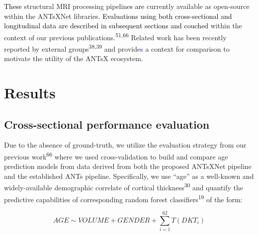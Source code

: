 \documentclass[
  12pt,
]{article}
\begin{document}
\textcolor{black}{These} structural MRI processing
pipeline\textcolor{black}{s
are} currently available as open-source within the ANTsXNet libraries.
\textcolor{black}{Evaluations using both cross-sectional and longitudinal data
are described in subsequent sections and couched} within the context of
our previous publications.\textsuperscript{51,66} Related work has been
recently reported by external groups\textsuperscript{38,39} and
provide\textcolor{blue}{s} a context for comparison to motivate the
utility of the ANTsX ecosystem.

\hypertarget{results}{%
\section*{Results}\label{results}}

\hypertarget{cross-sectional-performance-evaluation}{%
\subsection*{Cross-sectional performance
evaluation}\label{cross-sectional-performance-evaluation}}



Due to the absence of ground-truth, we utilize the evaluation strategy
from our previous work\textsuperscript{66} where we used
cross-validation to build and compare age prediction models from data
derived from both the proposed ANTsXNet pipeline and the established
ANTs pipeline. Specifically, we use ``age'' as a well-known and
widely-available demographic correlate of cortical
thickness\textsuperscript{30} and quantify the predictive capabilities
of corresponding random forest classifiers\textsuperscript{19} of the
form:

\begin{equation}
AGE \sim VOLUME + GENDER + \sum_{i=1}^{62} T(DKT_i)
\end{equation}
\end{document}
